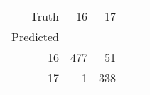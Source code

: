\begin{tabular}{rrrrr}
\toprule
Truth & 16 & 17 \\
Predicted &  &  \\
\midrule
16 & 477 & 51 \\
17 & 1 & 338 \\
\bottomrule
\end{tabular}
